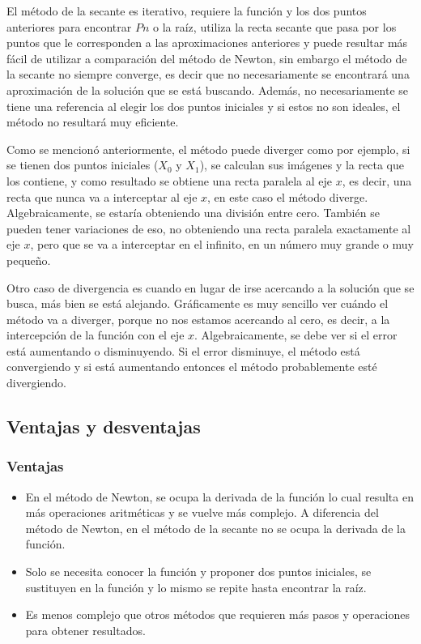 El método de la secante es iterativo, requiere la función y los dos puntos anteriores para encontrar $Pn$ o la raíz, utiliza la recta secante que pasa por los puntos que le corresponden a las aproximaciones anteriores y puede resultar más fácil de utilizar a comparación del método de Newton, sin embargo el método de la secante no siempre converge, es decir que no necesariamente se encontrará una aproximación de la solución que se está buscando.  Además, no necesariamente se tiene una referencia al elegir los dos puntos iniciales y si estos no son ideales, el método no resultará muy eficiente. 

Como se mencionó anteriormente, el método puede diverger como por ejemplo, si se tienen dos puntos iniciales ($X_0$ y $X_1$), se calculan sus imágenes y la recta que los contiene, y como resultado se obtiene una recta paralela al eje $x$, es decir, una recta que nunca va a interceptar al eje $x$, en este caso el método diverge. Algebraicamente, se estaría obteniendo una división entre cero. También se pueden tener variaciones de eso, no obteniendo una recta paralela exactamente al eje $x$, pero que se va a interceptar en el infinito, en un número muy grande o muy pequeño.


Otro caso de divergencia es cuando en lugar de irse acercando a la solución que se busca, más bien se está alejando. Gráficamente es muy sencillo ver cuándo el método va a diverger, porque no nos estamos acercando al cero, es decir, a la intercepción de la función con el eje $x$. Algebraicamente, se debe ver si el error está aumentando o disminuyendo. Si el error disminuye, el método está convergiendo y si está aumentando entonces el método probablemente esté divergiendo. 


\subsection{Ventajas y desventajas}

\subsubsection{Ventajas}

\begin{itemize}
  \item En el método de Newton, se ocupa la derivada de la función lo cual resulta en más operaciones aritméticas y se vuelve más complejo. A diferencia del método de Newton, en el método de la secante no se ocupa la derivada de la función.
  \item Solo se necesita conocer la función y proponer dos puntos iniciales, se sustituyen en la función y lo mismo se repite hasta encontrar la raíz.
  \item Es menos complejo que otros métodos que requieren más pasos y operaciones para obtener resultados.
\end{itemize}

